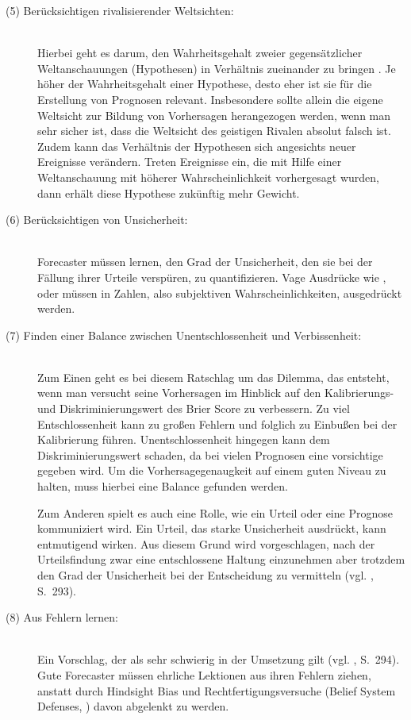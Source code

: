 \begin{description}
\item[(5) Berücksichtigen rivalisierender Weltsichten:] \hfill \\
Hierbei geht es darum, den Wahrheitsgehalt zweier gegensätzlicher Weltanschauungen (Hypothesen) in Verhältnis zueinander zu bringen .
Je höher der Wahrheitsgehalt einer Hypothese, desto eher ist sie für die Erstellung von Prognosen relevant. Insbesondere
sollte allein die eigene Weltsicht zur Bildung von Vorhersagen herangezogen werden, wenn man sehr sicher ist, dass die Weltsicht des
geistigen Rivalen absolut falsch ist. Zudem kann das Verhältnis der Hypothesen sich angesichts neuer Ereignisse verändern.
Treten Ereignisse ein, die mit Hilfe einer Weltanschauung mit höherer Wahrscheinlichkeit vorhergesagt wurden, dann erhält diese
Hypothese zukünftig mehr Gewicht.

\item[(6) Berücksichtigen von Unsicherheit:] \hfill \\
Forecaster müssen lernen, den Grad der Unsicherheit, den sie bei der Fällung ihrer Urteile verspüren, zu quantifizieren.
Vage Ausdrücke wie \grqq{}, \grqq{} oder \grqq{} müssen in
Zahlen, also subjektiven Wahrscheinlichkeiten, ausgedrückt werden.

\item[(7) Finden einer Balance zwischen Unentschlossenheit und Verbissenheit:] \hfill \\
Zum Einen geht es bei diesem Ratschlag um das Dilemma, das entsteht, wenn man versucht seine Vorhersagen im Hinblick auf
den Kalibrierungs- und Diskriminierungswert des Brier Score  zu verbessern. Zu viel Entschlossenheit
kann zu großen Fehlern und folglich zu Einbußen bei der Kalibrierung führen. Unentschlossenheit hingegen kann dem
Diskriminierungswert schaden, da bei vielen Prognosen eine vorsichtige \grqq{} gegeben wird. Um
die Vorhersagegenaugkeit auf einem guten Niveau zu halten, muss hierbei eine Balance gefunden werden.

Zum Anderen spielt es auch eine Rolle, wie ein Urteil oder eine Prognose kommuniziert wird. Ein Urteil, das starke
Unsicherheit ausdrückt, kann entmutigend wirken. Aus diesem Grund wird vorgeschlagen, nach der Urteilsfindung zwar
eine entschlossene Haltung einzunehmen aber trotzdem den Grad der Unsicherheit bei der Entscheidung zu vermitteln
(vgl. \cite{Jackson}, S.~293).

\item[(8) Aus Fehlern lernen:] \hfill \\
Ein Vorschlag, der als sehr schwierig in der Umsetzung gilt (vgl. \cite{Jackson}, S.~294). Gute Forecaster müssen
ehrliche Lektionen aus ihren Fehlern ziehen, anstatt durch Hindsight Bias  und Rechtfertigungsversuche
(Belief System Defenses, ) davon abgelenkt zu werden.


\end{description}
